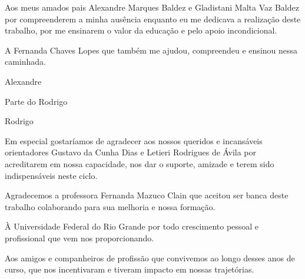 Aos meus amados pais Alexandre Marques Baldez e Gladistani Malta Vaz Baldez por compreenderem a minha ausência enquanto eu me dedicava a realização deste trabalho, por me ensinarem o valor da educação e pelo apoio incondicional.

A Fernanda Chaves Lopes que também me ajudou, compreendeu e ensinou nessa caminhada.

\begin{flushright}Alexandre\end{flushright}

Parte do Rodrigo

\begin{flushright}Rodrigo\end{flushright}
    
Em especial gostaríamos de agradecer aos nossos queridos e incansáveis orientadores Gustavo da Cunha Dias e Letieri Rodrigues de Ávila por acreditarem em nossa capacidade, nos dar o suporte, amizade e terem sido indispensáveis neste ciclo.

Agradecemos a professora Fernanda Mazuco Clain que aceitou ser banca deste trabalho colaborando para sua melhoria e nossa formação.

À Universidade Federal do Rio Grande por todo crescimento pessoal e profissional que vem nos proporcionando.

Aos amigos e companheiros de profissão que convivemos ao longo desses anos de curso, que nos incentivaram e tiveram impacto em nossas trajetórias.
